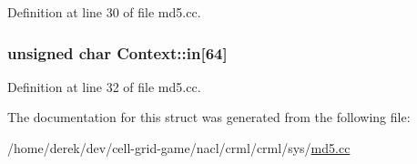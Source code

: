 Definition at line 30 of file md5.cc.

\hypertarget{struct_context_aa61c772c852c42003af44ec1c6bb56dc}{
\subsubsection[{in}]{\setlength{\rightskip}{0pt plus 5cm}unsigned char {\bf Context::in}\mbox{[}64\mbox{]}}}
\label{struct_context_aa61c772c852c42003af44ec1c6bb56dc}


Definition at line 32 of file md5.cc.



The documentation for this struct was generated from the following file:\begin{DoxyCompactItemize}
\item 
/home/derek/dev/cell-\/grid-\/game/nacl/crml/crml/sys/\hyperlink{md5_8cc}{md5.cc}\end{DoxyCompactItemize}
